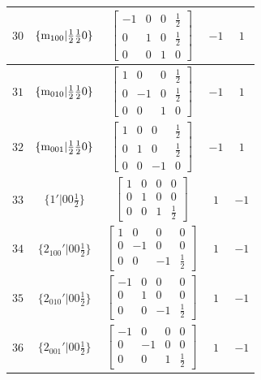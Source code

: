 \documentclass[fleqn,8pt]{jsarticle}
\begin{document}
\begin{longtable}{ccccc}
$ 30 $ & $ \{{\rm m}_{100}|\frac{1}{2} \frac{1}{2} 0\} $ & $ \begin{bmatrix} -1 & 0 & 0 & \frac{1}{2} \\ 0 & 1 & 0 & \frac{1}{2} \\ 0 & 0 & 1 & 0 \end{bmatrix} $ & $ -1 $ & $ 1 $ \\ \hline
$ 31 $ & $ \{{\rm m}_{010}|\frac{1}{2} \frac{1}{2} 0\} $ & $ \begin{bmatrix} 1 & 0 & 0 & \frac{1}{2} \\ 0 & -1 & 0 & \frac{1}{2} \\ 0 & 0 & 1 & 0 \end{bmatrix} $ & $ -1 $ & $ 1 $ \\ \hline
$ 32 $ & $ \{{\rm m}_{001}|\frac{1}{2} \frac{1}{2} 0\} $ & $ \begin{bmatrix} 1 & 0 & 0 & \frac{1}{2} \\ 0 & 1 & 0 & \frac{1}{2} \\ 0 & 0 & -1 & 0 \end{bmatrix} $ & $ -1 $ & $ 1 $ \\ \hline
$ 33 $ & $ \{1{}'|0 0 \frac{1}{2}\} $ & $ \begin{bmatrix} 1 & 0 & 0 & 0 \\ 0 & 1 & 0 & 0 \\ 0 & 0 & 1 & \frac{1}{2} \end{bmatrix} $ & $ 1 $ & $ -1 $ \\ \hline
$ 34 $ & $ \{2{}_{100}{}'|0 0 \frac{1}{2}\} $ & $ \begin{bmatrix} 1 & 0 & 0 & 0 \\ 0 & -1 & 0 & 0 \\ 0 & 0 & -1 & \frac{1}{2} \end{bmatrix} $ & $ 1 $ & $ -1 $ \\ \hline
$ 35 $ & $ \{2{}_{010}{}'|0 0 \frac{1}{2}\} $ & $ \begin{bmatrix} -1 & 0 & 0 & 0 \\ 0 & 1 & 0 & 0 \\ 0 & 0 & -1 & \frac{1}{2} \end{bmatrix} $ & $ 1 $ & $ -1 $ \\ \hline
$ 36 $ & $ \{2{}_{001}{}'|0 0 \frac{1}{2}\} $ & $ \begin{bmatrix} -1 & 0 & 0 & 0 \\ 0 & -1 & 0 & 0 \\ 0 & 0 & 1 & \frac{1}{2} \end{bmatrix} $ & $ 1 $ & $ -1 $ \\ \hline

\end{longtable}
\end{document}
